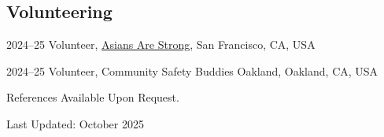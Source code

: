 \documentclass[11pt,letterpaper]{article}
\begin{document}
\subsection{Volunteering}
\begin{tablist}
  \item[2024–25] \tab{}Volunteer, \href{https://asiansarestrong.org/}{Asians Are Strong}, San Francisco, CA, USA
  \item[2024–25] \tab{}Volunteer, Community Safety Buddies Oakland, Oakland, CA, USA
\end{tablist}

\vspace{1.0\baselineskip}
References Available Upon Request.\par\vspace{.2\baselineskip}
{\footnotesize Last Updated: October 2025}
\end{document}

